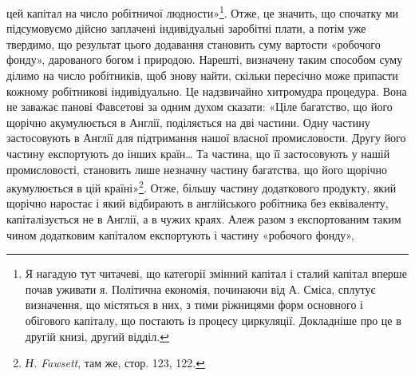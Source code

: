 \parcont{}  %
цей капітал на число робітничої людности»\footnote{
Я нагадую тут читачеві, що категорії змінний капітал і сталий
капітал вперше почав уживати я. Політична економія, починаючи від
А. Сміса, сплутує визначення, що містяться в них, з тими ріжницями
форм основного і обігового капіталу, що постають із процесу циркуляції.
Докладніше про це в другій книзі, другий відділ.
}. Отже, це значить,
що спочатку ми підсумовуємо дійсно заплачені індивідуальні
заробітні плати, а потім уже твердимо, що результат цього додавання
становить суму вартости «робочого фонду», дарованого
богом і природою. Нарешті, визначену таким способом суму
ділимо на число робітників, щоб знову найти, скільки пересічно
може припасти кожному робітникові індивідуально. Це надзвичайно
хитромудра процедура. Вона не заважає панові Фавсетові
за одним духом сказати: «Ціле багатство, що його щорічно
акумулюється в Англії, поділяється на дві частини. Одну
частину застосовують в Англії для підтримання нашої власної
промисловости. Другу його частину експортують до інших
країн\dots{} Та частина, що її застосовують у нашій промисловості,
становить лише незначну частину багатства, що його щорічно
акумулюється в цій країні»\footnote{
\emph{Н. Fawsett}, там же, стор. 123, 122.
}. Отже, більшу частину додаткового
продукту, який щорічно наростає і який відбирають в англійського
робітника без еквіваленту, капіталізується не в Англії,
а в чужих краях. Алеж разом з експортованим таким чином
додатковим капіталом експортують і частину «робочого фонду»,
